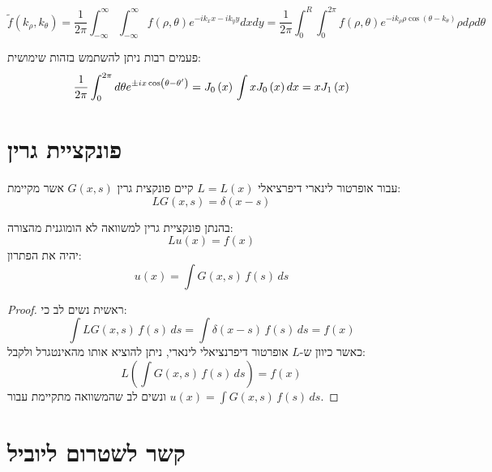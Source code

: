 \documentclass{tstextbook}
\begin{document}
\begin{proposition}
$$\tilde{f}\left(k_\rho,k_\theta\right)=\frac{1}{2\pi}\int_{-\infty}^\infty\int_{-\infty}^\infty f\left( \rho,\theta \right)e^{-ik_xx-ik_yy}dxdy=\frac{1}{2\pi}\int_0^R\int_0^{2\pi}f\left( \rho,\theta \right)e^{-ik_\rho\rho\cos\left( \theta-k_\theta \right)}\rho d\rho d\theta$$

\end{proposition}
\begin{remark}
פעמים רבות ניתן להשתמש בזהות שימושית:
$$\frac{1}{2\pi}\int_{0}^{2\pi}d\theta e^{\pm ix\cos\left(\theta-\theta'\right)}=J_{0}\left(x\right)\\\int xJ_{0}\left(x\right)dx=xJ_{1}\left(x\right)$$

\end{remark}
\section{פונקציית גרין}

\begin{definition}
עבור אופרטור לינארי דיפרציאלי \(L=L(x)\) קיים פונקצית גרין \(G(x,s)\) אשר מקיימת:
$$LG(x,s)=\delta(x-s)$$

\end{definition}
\begin{proposition}
בהנתן פונקציית גרין למשוואה לא הומוגנית מהצורה:
$$Lu(x)=f(x)$$
יהיה את הפתרון:
$$u(x)=\int G(x,s)\,f(s)\,d s$$

\end{proposition}
\begin{proof}
ראשית נשים לב כי:
$$\int L G(x,s)\,f(s)\,d s=\int\delta(x-s)\,f(s)\,d s=f(x)$$
כאשר כיוון ש-\(L\) אופרטור דיפרנציאלי לינארי, ניתן להוציא אותו מהאינטגרל ולקבל:
$$L\left(\int G(x,s)\,f(s)\,d s\right)=f(x)$$
ונשים לב שהמשוואה מתקיימת עבור \(u(x)=\int G(x,s)\,f(s)\,d s\).

\end{proof}
\section{קשר לשטרום ליוביל}
\end{document}
